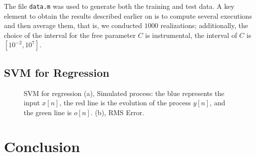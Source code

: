 \documentclass[letterpaper, 10 pt, conference]{ieeeconf}  %
\begin{document}
The file \verb|data.m| was used to generate both the training and test data. A key element to obtain the results described earlier on is to
compute several executions and then average them, that is, we conducted $1000$ realizations; additionally, the choice of the interval for the free parameter $C$ is instrumental, the interval of $C$ is $[10^{-2},10^{7}]$.


\subsection{SVM for Regression}
\label{sec:ExperimentSVMRegression}

\begin{figure}[ht!]
 \begin{center}
         \caption{SVM for regression (a), Simulated process: the blue represents the input $x[n]$, the red line is the evolution of the process $y[n]$, and 
         the green line is $o[n]$. (b), RMS Error.}
 \end{center}
\end{figure}

\section{Conclusion}
\label{sec:conclusion}
\end{document}
